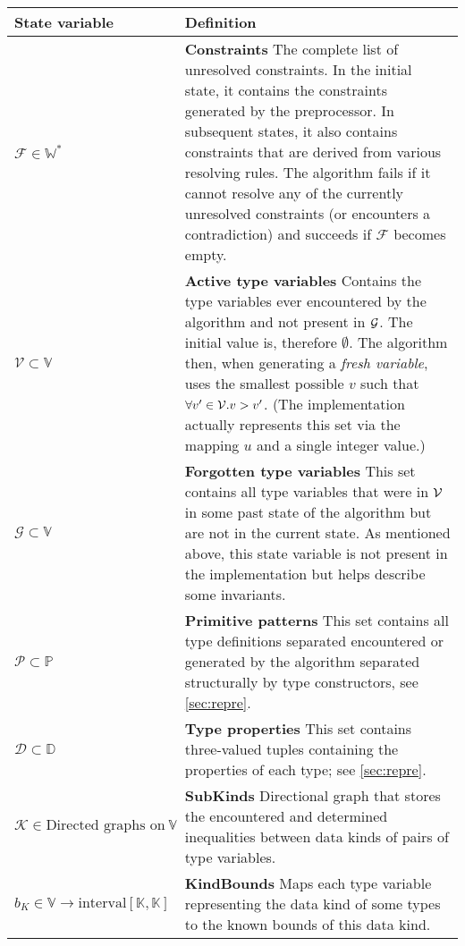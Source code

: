 \begin{table}
\scriptsize
\def\arraystretch{1.3}
\begin{tabular}{p{.23\linewidth}p{.7\linewidth}}
\toprule
State variable & Definition \\
\midrule
  $\mathcal{F} \in \mathbb{W}^\ast$ & \textbf{Constraints}\quad
  The complete list of unresolved constraints. In the initial state, it contains the constraints generated by the preprocessor. In subsequent states, it also contains constraints that are derived from various resolving rules. The algorithm fails if it cannot resolve any of the currently unresolved constraints (or encounters a contradiction) and succeeds if $\mathcal{F}$ becomes empty. \\

  $\mathcal{V} \subset \mathbb{V}$ & \textbf{Active type variables}\quad
  Contains the type variables ever encountered by the algorithm and not present in $\mathcal G$. The initial value is, therefore $\emptyset$. The algorithm then, when generating a \emph{fresh variable}, uses the smallest possible $v$ such that $\forall v' \in \mathcal V. v > v'$. (The implementation actually represents this set via the mapping $u$ and a single integer value.) \\

  $\mathcal{G} \subset \mathbb{V}$ & \textbf{Forgotten type variables}\quad
  This set contains all type variables that were in $\mathcal V$ in some past state of the algorithm but are not in the current state. As mentioned above, this state variable is not present in the implementation but helps describe some invariants. \\

  $\mathcal{P} \subset \mathbb{P}$ & \textbf{Primitive patterns}\quad
  This set contains all type definitions separated encountered or generated by the algorithm separated structurally by type constructors, see \cref{sec:repre}. \\

  $\mathcal{D} \subset \mathbb{D}$ & \textbf{Type properties}\quad
  This set contains three-valued tuples containing the properties of each type; see \cref{sec:repre}. \\

  $\mathcal{K} \in \text{Directed graphs on}\ \mathbb{V}$ & \textbf{SubKinds}\quad
  Directional graph that stores the encountered and determined inequalities between data kinds of pairs of type variables. \\

  $b_K \in \mathbb{V} \to \text{interval} \left[\mathbb{K}, \mathbb{K}\right]$ & \textbf{KindBounds}\quad
  Maps each type variable representing the data kind of some types to the known bounds of this data kind. \\


\end{tabular}
\end{table}
